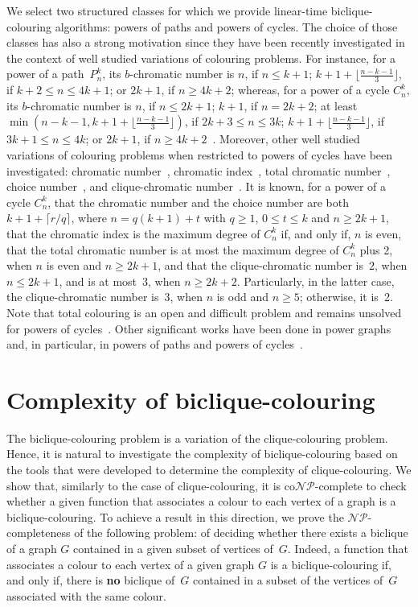 \documentclass{article}
\begin{document}
We select two structured
classes for which we provide linear-time biclique-colouring algorithms:
powers of paths and powers of cycles. The choice of those classes has also
a strong motivation since they have been recently investigated in the context of
well studied variations of colouring problems. 
For instance, for a power of a path~$P_n^k$, its $b$-chromatic number is $n$, if $n \leq k + 1$; $k +
1 + \lfloor \frac{n-k-1}{3} \rfloor$, if $k + 2 \leq n \leq 4k + 1$; or $2k +
1$, if $n \geq 4k + 2$; whereas, for a power of a cycle
$C_{n}^{k}$, its $b$-chromatic number is $n$, if $n \leq 2k + 1$; $k + 1$, if $n
= 2k + 2$; at least $\min(n-k-1, k + 1 + \lfloor \frac{n-k-1}{3} \rfloor)$, if $2k + 3
\leq n \leq 3k$; $k + 1 + \lfloor \frac{n-k-1}{3} \rfloor$, if $3k + 1 \leq n
\leq 4k$; or $2k + 1$, if $n \geq 4k + 2$~\cite{MR1979111}. Moreover, other well
studied variations of colouring problems when restricted to powers of cycles have been
investigated: chromatic number~\cite{MR1974376}, chromatic
index~\cite{meidanis}, total chromatic number~\cite{MR2303972}, choice
number~\cite{MR1974376}, and clique-chromatic number~\cite{MR2570638}.
It is known, for a power of a cycle $C_{n}^{k}$, that
the chromatic number and the choice number are both $k + 1 + \lceil r/q
\rceil$, where $n = q(k+1) + t$ with $q \geq 1$, $0 \leq t \leq k$ and $n \geq
2k + 1$, that the chromatic index is the maximum degree of $C_{n}^{k}$ if, and only if,
$n$ is even, that the total chromatic number is at most the maximum degree of
$C_{n}^{k}$ plus 2, when $n$ is even and $n \geq 2k + 1$, and that the
clique-chromatic number is~$2$, when $n \leq 2k + 1$, and is at most~3, when $n
\geq 2k + 2$.
Particularly, in the latter case, the clique-chromatic number is~3, when $n$ is
odd and $n \geq 5$; otherwise, it is~2. Note that total colouring is an open
and difficult problem and remains unsolved for powers of cycles~\cite{MR2303972}. Other
significant works have been done in power
graphs~\cite{MR1454439,MR2423405} and, in particular, in powers of
paths and powers of
cycles~\cite{MR1018529,MR1172679,MR2083449,MR2774114,MR1633075,MR2255625}.

\section{Complexity of biclique-colouring}

The biclique-colouring problem is a variation of the clique-colouring problem. Hence,
it is natural to investigate the complexity of biclique-colouring based on the
tools that were developed to determine the complexity of clique-colouring. 
We show that, similarly to the case of clique-colouring, it is
co$\mathcal{NP}$-complete to check whether a given function that associates a
colour to each vertex of a graph is a biclique-colouring.
To achieve a result in this direction, we prove the $\mathcal{NP}$-completeness
of the following problem: of deciding whether there exists a biclique of a
graph $G$ contained in a given subset of vertices of~$G$. Indeed, a function
that associates a colour to each vertex of a given graph $G$ is a
biclique-colouring if, and only if, there is {\bf no} biclique of~$G$
contained in a subset of the vertices of~$G$ associated with the same colour.
\end{document}
